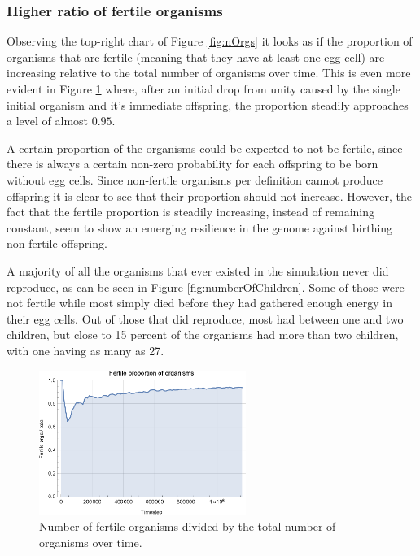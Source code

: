 \subsubsection{Higher ratio of fertile organisms}
Observing the top-right chart of Figure \ref{fig:nOrgs} it looks as if the proportion of organisms that are fertile (meaning that they have at least one egg cell) are increasing relative to the total number of organisms over time. This is even more evident in Figure \ref{fig:fertileProp} where, after an initial drop from unity caused by the single initial organism and it's immediate offspring, the proportion steadily approaches a level of almost \(0.95\).

A certain proportion of the organisms could be expected to not be fertile, since there is always a certain non-zero probability for each offspring to be born without egg cells. Since non-fertile organisms per definition cannot produce offspring it is clear to see that their proportion should not increase. However, the fact that the fertile proportion is steadily increasing, instead of remaining constant, seem to show an emerging resilience in the genome against birthing non-fertile offspring.

A majority of all the organisms that ever existed in the simulation never did reproduce, as can be seen in Figure \ref{fig:numberOfChildren}. Some of those were not fertile while most simply died before they had gathered enough energy in their egg cells. Out of those that did reproduce, most had between one and two children, but close to 15 percent of the organisms had more than two children, with one having as many as 27.

\begin{figure}
  \begin{center}
  \includegraphics[width=0.6\textwidth]{figure/fertileProp}
  \caption{
    Number of fertile organisms divided by the total number of organisms over time.
  }
  \label{fig:fertileProp}
  \end{center}
\end{figure}

